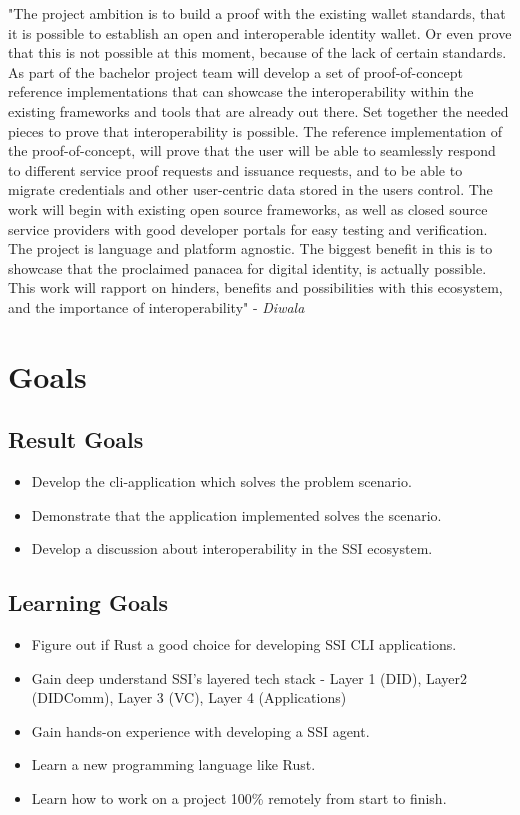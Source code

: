 "The project ambition is to build a proof with the existing wallet standards, that it is possible to establish an open and interoperable identity wallet. Or even prove that this is not possible at this moment, because of the lack of certain standards. As part of the bachelor project team will develop a set of proof-of-concept reference implementations that can showcase the interoperability within the existing frameworks and tools that are already out there. Set together the needed pieces to prove that interoperability is possible. The reference implementation of the proof-of-concept, will prove that the user will be able to seamlessly respond to different service proof requests and issuance requests, and to be able to migrate credentials and other user-centric data stored in the users control. The work will begin with existing open source frameworks, as well as closed source service providers with good developer portals for easy testing and verification. The project is language and platform agnostic. The biggest benefit in this is to showcase that the proclaimed panacea for digital identity, is actually possible. This work will rapport on hinders, benefits and possibilities with this ecosystem, and the importance of interoperability" \cite{ProjectDescription} - \textit{Diwala}






\section{Goals}

\subsection{Result Goals}

\begin{itemize}
\item Develop the \acrshort{cli}-application which solves the problem scenario.
\item Demonstrate that the application implemented solves the scenario.
\item Develop a discussion about interoperability in the SSI ecosystem.
\end{itemize}

\subsection{Learning Goals}

\begin{itemize}
\item Figure out if Rust a good choice for developing SSI CLI applications.
\item Gain deep understand SSI's layered tech stack - Layer 1 (DID), Layer2 (DIDComm), Layer 3 (VC), Layer 4 (Applications)
\item Gain hands-on experience with developing a SSI agent.
\item Learn a new programming language like Rust.
\item Learn how to work on a project 100\% remotely from start to finish.
\end{itemize}




